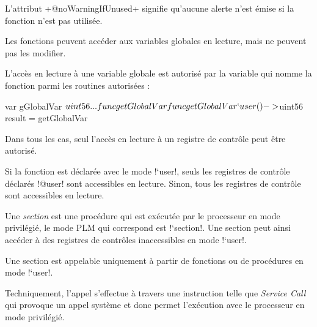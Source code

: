 L'attribut \plm+@noWarningIfUnused+ signifie qu'aucune alerte n'est émise si la fonction n'est pas utilisée.




Les fonctions peuvent accéder aux variables globales en lecture, mais ne peuvent pas les modifier.

L'accès en lecture à une variable globale est autorisé par la variable qui nomme la fonction parmi les routines autorisées :

\begin{PLM}
var gGlobalVar $uint56 {
  ...
  func getGlobalVar
}

func getGlobalVar `user () -> $uint56 {
  result = getGlobalVar
}
\end{PLM}





Dans tous les cas, seul l'accès en lecture à un registre de contrôle peut être autorisé.


Si la fonction est déclarée avec le mode \plm!`user!, seuls les registres de contrôle déclarés \plm!@user! sont accessibles en lecture. Sinon, tous les registres de contrôle sont accessibles en lecture.




















Une \emph{section} est une procédure qui est exécutée par le processeur en mode privilégié, le mode PLM qui correspond est \plm!`section!. Une section peut ainsi accéder à des registres de contrôles inaccessibles en mode \plm!`user!.

Une section est appelable uniquement à partir de fonctions ou de procédures en mode \plm!`user!.

Techniquement, l'appel s'effectue à travers une instruction telle que \emph{Service Call} qui provoque un appel système et donc permet l'exécution avec le processeur en mode privilégié.



